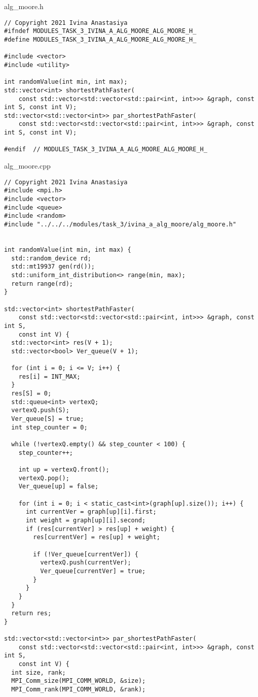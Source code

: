 \documentclass{report}
\begin{document}
alg\_moore.h
\begin{lstlisting}
// Copyright 2021 Ivina Anastasiya
#ifndef MODULES_TASK_3_IVINA_A_ALG_MOORE_ALG_MOORE_H_
#define MODULES_TASK_3_IVINA_A_ALG_MOORE_ALG_MOORE_H_

#include <vector>
#include <utility>

int randomValue(int min, int max);
std::vector<int> shortestPathFaster(
    const std::vector<std::vector<std::pair<int, int>>> &graph, const int S, const int V);
std::vector<std::vector<int>> par_shortestPathFaster(
    const std::vector<std::vector<std::pair<int, int>>> &graph, const int S, const int V);

#endif  // MODULES_TASK_3_IVINA_A_ALG_MOORE_ALG_MOORE_H_

\end{lstlisting}
alg\_moore.cpp
\begin{lstlisting}
// Copyright 2021 Ivina Anastasiya
#include <mpi.h>
#include <vector>
#include <queue>
#include <random>
#include "../../../modules/task_3/ivina_a_alg_moore/alg_moore.h"


int randomValue(int min, int max) {
  std::random_device rd;
  std::mt19937 gen(rd());
  std::uniform_int_distribution<> range(min, max);
  return range(rd);
}

std::vector<int> shortestPathFaster(
    const std::vector<std::vector<std::pair<int, int>>> &graph, const int S,
    const int V) {
  std::vector<int> res(V + 1);
  std::vector<bool> Ver_queue(V + 1);

  for (int i = 0; i <= V; i++) {
    res[i] = INT_MAX;
  }
  res[S] = 0;
  std::queue<int> vertexQ;
  vertexQ.push(S);
  Ver_queue[S] = true;
  int step_counter = 0;

  while (!vertexQ.empty() && step_counter < 100) {
    step_counter++;

    int up = vertexQ.front();
    vertexQ.pop();
    Ver_queue[up] = false;

    for (int i = 0; i < static_cast<int>(graph[up].size()); i++) {
      int currentVer = graph[up][i].first;
      int weight = graph[up][i].second;
      if (res[currentVer] > res[up] + weight) {
        res[currentVer] = res[up] + weight;

        if (!Ver_queue[currentVer]) {
          vertexQ.push(currentVer);
          Ver_queue[currentVer] = true;
        }
      }
    }
  }
  return res;
}

std::vector<std::vector<int>> par_shortestPathFaster(
    const std::vector<std::vector<std::pair<int, int>>> &graph, const int S,
    const int V) {
  int size, rank;
  MPI_Comm_size(MPI_COMM_WORLD, &size);
  MPI_Comm_rank(MPI_COMM_WORLD, &rank);


\end{lstlisting}
\end{document}
